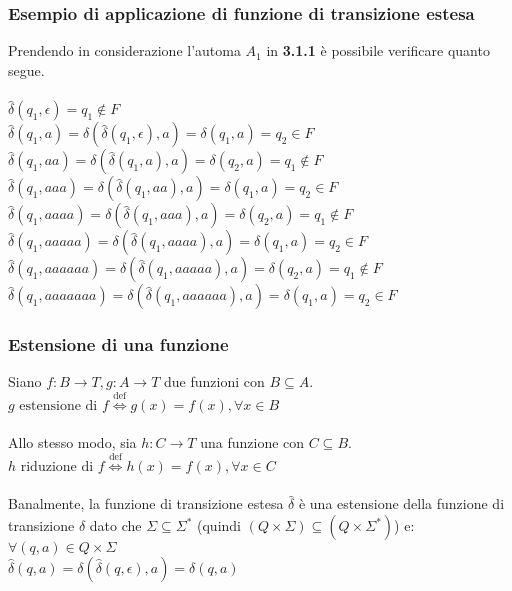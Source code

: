 \documentclass[]{article}
\begin{document}
\subsubsection{Esempio di applicazione di funzione di transizione estesa}

Prendendo in considerazione l'automa \mbox{$A_1$} in \textbf{3.1.1} è possibile verificare quanto segue.
\\
\\
\mbox{$ \hat\delta(q_1, \epsilon) = q_1 \not\in F $}
\\
\mbox{$ \hat\delta(q_1, a) = \delta( \hat\delta(q_1, \epsilon) , a) = \delta( q_1 , a) = q_2 \in F $}
\\
\mbox{$ \hat\delta(q_1, aa) = \delta( \hat\delta(q_1, a) , a) = \delta( q_2 , a) = q_1 \not\in F $}
\\
\mbox{$ \hat\delta(q_1, aaa) = \delta( \hat\delta(q_1, aa) , a) = \delta( q_1 , a) = q_2 \in F $}
\\
\mbox{$ \hat\delta(q_1, aaaa) = \delta( \hat\delta(q_1, aaa) , a) = \delta( q_2 , a) = q_1 \not\in F $}
\\
\mbox{$ \hat\delta(q_1, aaaaa) = \delta( \hat\delta(q_1, aaaa) , a) = \delta( q_1 , a) = q_2 \in F $}
\\
\mbox{$ \hat\delta(q_1, aaaaaa) = \delta( \hat\delta(q_1, aaaaa) , a) = \delta( q_2 , a) = q_1 \not\in F $}
\\
\mbox{$ \hat\delta(q_1, aaaaaaa) = \delta( \hat\delta(q_1, aaaaaa) , a) = \delta( q_1 , a) = q_2 \in F $}



\subsubsection{Estensione di una funzione}

Siano \mbox{$f \colon B \to T, g \colon A \to T$} due funzioni con \mbox{$ B \subseteq A $}.
\\
\mbox{$ g \text{ estensione di } f \overset{\text{def}}{\Leftrightarrow} g(x) = f(x), \forall x \in B $}
\\
\\
Allo stesso modo, sia \mbox{$h \colon C \to T$} una funzione con \mbox{$ C \subseteq B $}.
\\
\mbox{$ h \text{ riduzione di } f \overset{\text{def}}{\Leftrightarrow} h(x) = f(x), \forall x \in C $}
\\
\\
Banalmente, la funzione di transizione estesa \mbox{$ \hat\delta $} è una estensione della funzione di
transizione \mbox{$ \delta $} dato che \mbox{$ \Sigma \subseteq \Sigma^* $}
(quindi \mbox{$ (Q \times \Sigma) \subseteq (Q \times \Sigma^*) $}) e:
\\
\mbox{$ \forall (q, a) \in Q \times \Sigma $}
\\
\mbox{$ \hat\delta(q, a) = \delta(\hat\delta(q, \epsilon), a) = \delta(q, a) $}
\end{document}
